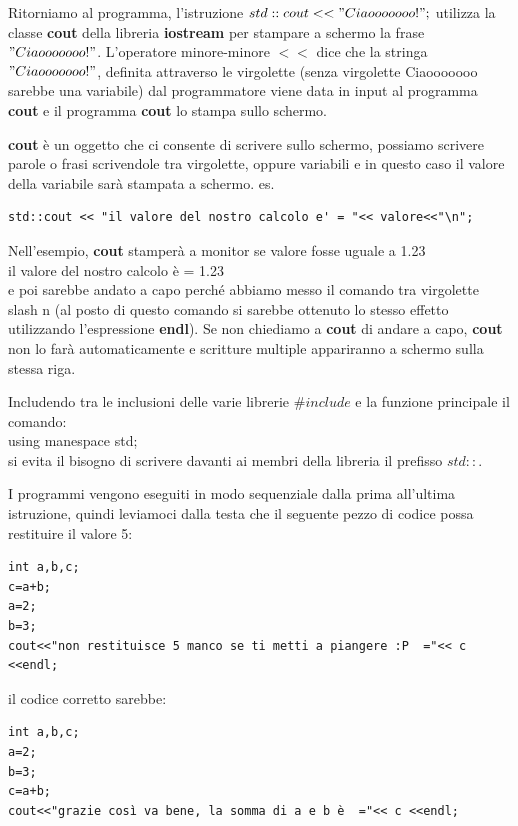 \documentclass[11pt,fleqn]{book} %
\begin{document}
Ritorniamo al programma, l'istruzione  $std::cout << "Ciaooooooo!";$
utilizza la classe \textbf{cout} della libreria \textbf{iostream} per stampare a schermo la frase $"Ciaooooooo!"$. L'operatore minore-minore $<<$ dice che la stringa $"Ciaooooooo!"$, definita attraverso le virgolette (senza virgolette Ciaooooooo sarebbe una variabile) dal programmatore viene data in input al programma \textbf{cout} e il programma \textbf{cout} lo stampa sullo schermo.

\textbf{cout} è un oggetto che ci consente di scrivere sullo schermo, possiamo scrivere parole o frasi scrivendole tra virgolette, oppure variabili
e in questo caso il valore della variabile sarà stampata a schermo.
es.

\begin{verbatim}
std::cout << "il valore del nostro calcolo e' = "<< valore<<"\n";
\end{verbatim} 

Nell'esempio, \textbf{cout} stamperà a monitor se valore fosse uguale a 1.23\\
il valore del nostro calcolo è = 1.23\\
e poi sarebbe andato a capo perché abbiamo messo il comando tra virgolette slash n (al posto di questo comando si sarebbe ottenuto lo stesso effetto utilizzando l'espressione \textbf{endl}). Se non chiediamo a \textbf{cout} di andare a capo, \textbf{cout} non lo farà automaticamente e scritture multiple appariranno a schermo sulla stessa riga.

Includendo tra le inclusioni delle varie librerie $\#include$ e la funzione principale il comando:\\
using manespace std;\\
si evita il bisogno di scrivere davanti ai membri della libreria il prefisso $std::$.


I programmi vengono eseguiti in modo sequenziale dalla prima all'ultima istruzione, quindi leviamoci dalla testa che il seguente pezzo di codice possa restituire il valore 5:

\begin{verbatim}
int a,b,c;
c=a+b;
a=2;
b=3;
cout<<"non restituisce 5 manco se ti metti a piangere :P  ="<< c <<endl;
\end{verbatim} 

il codice corretto sarebbe:

\begin{verbatim}
int a,b,c;
a=2;
b=3;
c=a+b;
cout<<"grazie così va bene, la somma di a e b è  ="<< c <<endl;
\end{verbatim} 
 
\end{document}
